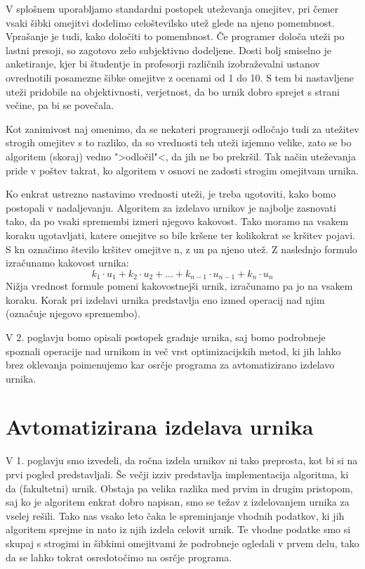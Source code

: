 \documentclass[a4paper,10pt]{article}
\begin{document}
V splošnem uporabljamo standardni postopek uteževanja omejitev, pri čemer vsaki šibki
omejitvi dodelimo celoštevilsko utež glede na njeno pomembnost. Vprašanje je tudi, kako
določiti to pomembnost. Če programer določa uteži po lastni presoji, so zagotovo zelo
subjektivno dodeljene. Dosti bolj smiselno je anketiranje, kjer bi študentje in profesorji
različnih izobraževalni ustanov ovrednotili posamezne šibke omejitve z ocenami od 1 do 10.
S tem bi nastavljene uteži pridobile na objektivnosti, verjetnost, da bo urnik dobro
sprejet s strani večine, pa bi se povečala.

Kot zanimivost naj omenimo, da se nekateri programerji odločajo tudi za utežitev strogih
omejitev s to razliko, da so vrednosti teh uteži izjemno velike, zato se bo algoritem
(skoraj) vedno ">odločil"<, da jih ne bo prekršil. Tak način uteževanja pride v poštev
takrat, ko algoritem v osnovi ne zadosti strogim omejitvam urnika.

Ko enkrat ustrezno nastavimo vrednosti uteži, je treba ugotoviti, kako bomo postopali
v nadaljevanju. Algoritem za izdelavo urnikov je najbolje zasnovati tako, da po vsaki
spremembi izmeri njegovo kakovost. Tako moramo na vsakem koraku ugotavljati, katere
omejitve so bile kršene ter kolikokrat se kršitev pojavi. S kn označimo število
kršitev omejitve n, z un pa njeno utež. Z naslednjo formulo izračunamo
kakovost urnika:
\[
k_1\cdot u_1+k_2\cdot u_2 + ...+k_{n-1}\cdot u_{n-1}+k_n\cdot u_n   
\]
Nižja vrednost formule pomeni kakovostnejši urnik, izračunamo pa jo na vsakem koraku.
Korak pri izdelavi urnika predstavlja eno izmed operacij nad njim (označuje njegovo
spremembo).

V 2. poglavju bomo opisali postopek gradnje urnika, saj bomo podrobneje spoznali
operacije nad urnikom in več vrst optimizacijskih metod, ki jih lahko brez oklevanja
poimenujemo kar osrčje programa za avtomatizirano izdelavo urnika.
\section{Avtomatizirana izdelava urnika}
V 1. poglavju smo izvedeli, da ročna izdela urnikov ni tako preprosta, kot bi si
na prvi pogled predstavljali. Še večji izziv predstavlja implementacija algoritma, ki da
(fakultetni) urnik. Obstaja pa velika razlika med prvim in drugim pristopom, saj ko je
algoritem enkrat dobro napisan, smo se težav z izdelovanjem urnika za vselej rešili.
Tako nas vsako leto čaka le spreminjanje vhodnih podatkov, ki jih algoritem sprejme in
nato iz njih izdela celovit urnik. Te vhodne podatke smo si skupaj s strogimi in šibkimi
omejitvami že podrobneje ogledali v prvem delu, tako da se lahko tokrat osredotočimo na
osrčje programa.
\end{document}

